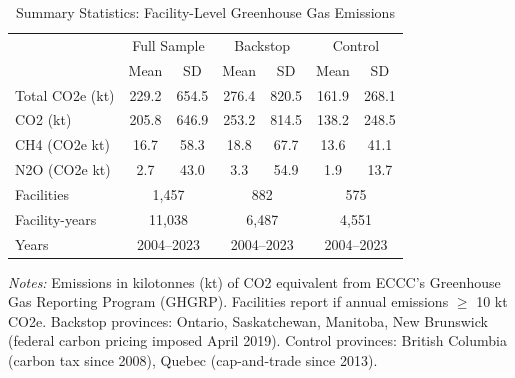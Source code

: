\begin{table}[htbp]
\centering
\caption{Summary Statistics: Facility-Level Greenhouse Gas Emissions}
\label{tab:summary}
\small
\begin{tabular}{l cc cc cc}
\hline\hline
 & \multicolumn{2}{c}{Full Sample} & \multicolumn{2}{c}{Backstop} & \multicolumn{2}{c}{Control} \\
 & Mean & SD & Mean & SD & Mean & SD \\
\hline
Total CO2e (kt) & 229.2 & 654.5 & 276.4 & 820.5 & 161.9 & 268.1 \\
CO2 (kt) & 205.8 & 646.9 & 253.2 & 814.5 & 138.2 & 248.5 \\
CH4 (CO2e kt) & 16.7 & 58.3 & 18.8 & 67.7 & 13.6 & 41.1 \\
N2O (CO2e kt) & 2.7 & 43.0 & 3.3 & 54.9 & 1.9 & 13.7 \\
\hline
Facilities & \multicolumn{2}{c}{1,457} & \multicolumn{2}{c}{882} & \multicolumn{2}{c}{575} \\
Facility-years & \multicolumn{2}{c}{11,038} & \multicolumn{2}{c}{6,487} & \multicolumn{2}{c}{4,551} \\
Years & \multicolumn{2}{c}{2004--2023} & \multicolumn{2}{c}{2004--2023} & \multicolumn{2}{c}{2004--2023} \\
\hline\hline
\end{tabular}
\begin{minipage}{0.95\textwidth}
\footnotesize
\textit{Notes:} Emissions in kilotonnes (kt) of CO2 equivalent from ECCC's Greenhouse Gas Reporting Program (GHGRP). Facilities report if annual emissions $\geq$ 10 kt CO2e. Backstop provinces: Ontario, Saskatchewan, Manitoba, New Brunswick (federal carbon pricing imposed April 2019). Control provinces: British Columbia (carbon tax since 2008), Quebec (cap-and-trade since 2013).
\end{minipage}
\end{table}
